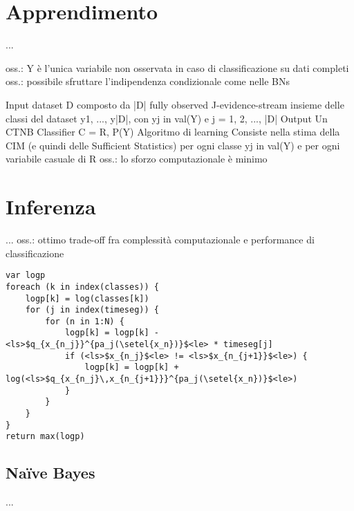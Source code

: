 \section{Apprendimento}\label{sec:learning-ctbnc}
...

oss.: Y è l'unica variabile non osservata in caso di classificazione su
dati completi
oss.: possibile sfruttare l'indipendenza condizionale come nelle BNs

Input
dataset D composto da |D| fully observed J-evidence-stream
insieme delle classi del dataset {y1, ..., y|D|}, con yj in val(Y) e j = 1,
2, ..., |D|
Output
Un CTNB Classifier C = {R, P(Y)}
Algoritmo di learning
Consiste nella stima della CIM (e quindi delle Sufficient Statistics) per
ogni classe yj in val(Y) e per ogni variabile casuale di R
oss.: lo sforzo computazionale è minimo



\section{Inferenza}\label{sec:inference-ctbnc}
...
oss.: ottimo trade-off fra complessità computazionale e performance di
classificazione

\begin{lstlisting}[caption=Inferenza \acs{CTBNC},label=lst:ctbnc-inference]
var logp
foreach (k in index(classes)) {
    logp[k] = log(classes[k])
    for (j in index(timeseg)) {
        for (n in 1:N) {
            logp[k] = logp[k] - <ls>$q_{x_{n_j}}^{pa_j(\setel{x_n})}$<le> * timeseg[j]
            if (<ls>$x_{n_j}$<le> != <ls>$x_{n_{j+1}}$<le>) {
                logp[k] = logp[k] + log(<ls>$q_{x_{n_j}\,x_{n_{j+1}}}^{pa_j(\setel{x_n})}$<le>)
            }
        }
    }
}
return max(logp)
\end{lstlisting}


\subsection{Na\"ive Bayes}\label{sec:inference-ctnb}
...

